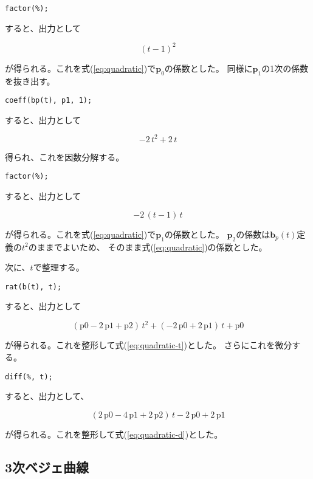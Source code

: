 \documentclass[dvipdfmx]{jsarticle}
\newcommand\VectBold[1]{\boldsymbol{#1}}
\newcommand\VectBold[1]{\symbf{#1}}
\newcommand\Vect[1]{\VectBold{#1}}
\begin{document}
\begin{lstlisting}
factor(%);
\end{lstlisting}

すると、出力として

\[
\left(t-1\right)^2
\]

が得られる。これを式(\ref{eq:quadratic})で$\Vect{p}_0$の係数とした。
同様に$\Vect{p}_1$の1次の係数を抜き出す。

\begin{lstlisting}
coeff(bp(t), p1, 1);
\end{lstlisting}

すると、出力として

\[
-2\,t^2+2\,t
\]

得られ、これを因数分解する。

\begin{lstlisting}
factor(%);
\end{lstlisting}

すると、出力として

\[
-2\,\left(t-1\right)\,t
\]

が得られる。これを式(\ref{eq:quadratic})で$\Vect{p}_1$の係数とした。
$\Vect{p}_2$の係数は$\Vect{b}_p\left(t\right)$定義の$t^2$のままでよいため、
そのまま式(\ref{eq:quadratic})の係数とした。

次に、$t$で整理する。

\begin{lstlisting}
rat(b(t), t);
\end{lstlisting}

すると、出力として

\[
\left(\mathrm{p0}-2\,\mathrm{p1}+\mathrm{p2}\right)\,t^2
+\left(-2\,\mathrm{p0}+2\,\mathrm{p1}\right)\,t+\mathrm{p0}
\]

が得られる。これを整形して式(\ref{eq:quadratic-t})とした。
さらにこれを微分する。

\begin{lstlisting}
diff(%, t);
\end{lstlisting}

すると、出力として、

\[
\left(2\,\mathrm{p0}-4\,\mathrm{p1}+2\,\mathrm{p2}\right)\,t
-2\,\mathrm{p0}+2\,\mathrm{p1}
\]

が得られる。これを整形して式(\ref{eq:quadratic-d})とした。

\subsection{3次ベジェ曲線}
\end{document}
